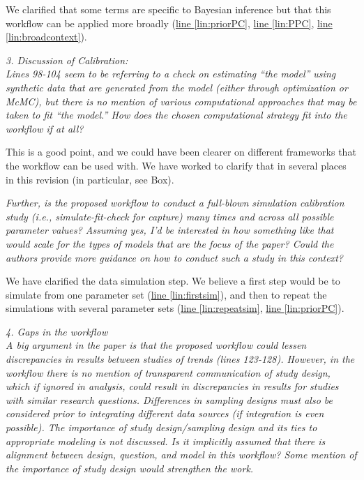 \documentclass[11pt,letter]{article}
\begin{document}
We clarified that some terms are specific to Bayesian inference but that this workflow can be applied more broadly (\href{file:forecastflows_r1\#lintarget:priorPC}{line \ref*{lin:priorPC}}, \href{file:forecastflows_r1\#lintarget:PPC}{line \ref*{lin:PPC}}, \href{file:forecastflows_r1\#lintarget:broadcontext}{line \ref*{lin:broadcontext}}).

\begin{mybox}
\emph{3. Discussion of Calibration:\\
Lines 98-104 seem to be referring to a check on estimating “the model” using synthetic data that are generated from the model (either through optimization or McMC), but there is no mention of various computational approaches that may be taken to fit “the model.” How does the chosen computational strategy fit into the workflow if at all?}
\end{mybox}

This is a good point, and we could have been clearer on different frameworks that the workflow can be used with. We have worked to clarify that in several places in this revision (in particular, see Box). %

\begin{mybox}
\emph{Further, is the proposed workflow to conduct a full-blown simulation calibration study (i.e., simulate-fit-check for capture) many times and across all possible parameter values? Assuming yes, I’d be interested in how something like that would scale for the types of models that are the focus of the paper? Could the authors provide more guidance on how to conduct such a study in this context?}
\end{mybox}

We have clarified the data simulation step. We believe a first step would be to simulate from one parameter set (\href{file:forecastflows_r1\#lintarget:firstsim}{line \ref*{lin:firstsim}}), and then to repeat the simulations with several parameter sets (\href{file:forecastflows_r1\#lintarget:repeatsim}{line \ref*{lin:repeatsim}}, \href{file:forecastflows_r1\#lintarget:priorPC}{line \ref*{lin:priorPC}}).

\begin{mybox}
\emph{4. Gaps in the workflow\\
A big argument in the paper is that the proposed workflow could lessen discrepancies in results between studies of trends (lines 123-128). However, in the workflow there is no mention of transparent communication of study design, which if ignored in analysis, could result in discrepancies in results for studies with similar research questions. Differences in sampling designs must also be considered prior to integrating different data sources (if integration is even possible). The importance of study design/sampling design and its ties to appropriate modeling is not discussed. Is it implicitly assumed that there is alignment between design, question, and model in this workflow? Some mention of the importance of study design would strengthen the work.}
\end{mybox}
\end{document}
